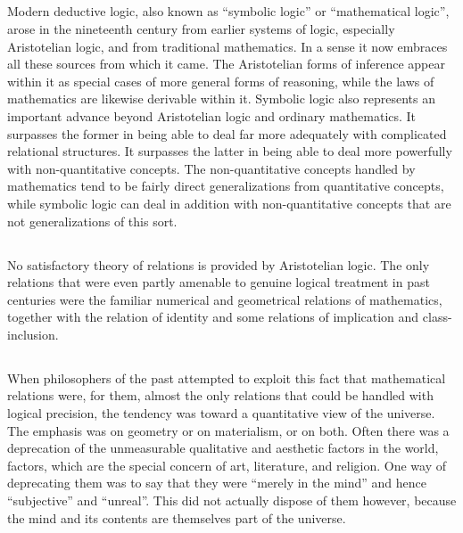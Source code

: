 \documentclass{book}
\let\oldmarginpar\marginpar
\renewcommand*{\marginpar}[1]{\oldmarginpar{\footnotesize#1}}
\begin{document}
\subsection{}
\label{sec:1.1}

Modern deductive logic, also known as “symbolic logic” or “mathematical logic”, arose in the nineteenth century from earlier systems of logic, especially Aristotelian logic, and from traditional mathematics.  In a sense it now embraces all these sources from which it came.  The Aristotelian forms of inference appear within it as special cases of more general forms of reasoning, while the laws of mathematics are likewise derivable within it.  Symbolic logic also represents an important advance beyond Aristotelian logic and ordinary mathematics.  It surpasses the former in being able to deal far more adequately with complicated relational structures.  It surpasses the latter in being able to deal more powerfully with non-quantitative concepts.  The non-quantitative concepts handled by mathematics tend to be fairly direct generalizations from quantitative concepts, while symbolic logic can deal in addition with non-quantitative concepts that are not generalizations of this sort.

\subsection{}
\label{sec:1.2}

No satisfactory theory of relations is provided by Aristotelian logic.  The only relations that were even partly amenable to genuine logical treatment in past centuries were the familiar numerical and geometrical relations of mathematics, together with the relation of identity and some relations of implication and class-inclusion.

\subsection{}
\label{sec:1.3}

When philosophers of the past attempted to exploit this fact that mathematical relations were, for them, almost the only relations that could be handled with logical precision, the tendency was toward a quantitative view of the universe.  The emphasis was on geometry or on materialism, or on both.  Often there was a deprecation of the unmeasurable qualitative and aesthetic factors in the world, factors, which are the special concern of art, literature, and religion.  One way of deprecating them was to say that they were “merely in the mind” \marginpar{4}and hence “subjective” and “unreal”.  This did not actually dispose of them however, because the mind and its contents are themselves part of the universe.
\end{document}
